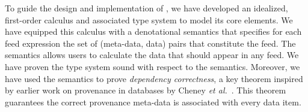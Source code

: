 

To guide the design and implementation of \padsd{}, we have developed
an idealized, first-order calculus and associated type system to model
its core elements.  We have equipped this calculus with a denotational
semantics that specifies for each feed expression the set of
(meta-data, data) pairs that constitute the feed. 
The semantics
allows users to calculate the data that should appear in any feed.
We have
proven the type system sound with respect to the semantics.
Moreover, we have used the
semantics to prove {\em dependency correctness}, a key theorem
inspired by earlier work on provenance in databases by 
Cheney {\em et al.}~\cite{cheney-dbpl07}.  This theorem
guarantees the correct provenance meta-data is associated with
every data item.  

